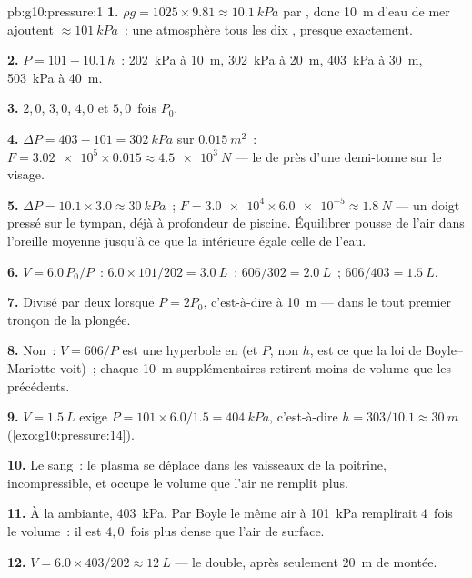 \begin{solution}{pb:g10:pressure:1}
\textbf{1.} $\rho g = 1025 \times 9.81 \approx \qty{10.1}{kPa}$ par
, donc \qty{10}{m} d'eau de mer ajoutent
$\approx \qty{101}{kPa}$~: une atmosphère tous les dix
, presque exactement.

\textbf{2.} $P = 101 + 10.1\,h$~: \qty{202}{kPa} à \qty{10}{m},
\qty{302}{kPa} à \qty{20}{m}, \qty{403}{kPa} à \qty{30}{m},
\qty{503}{kPa} à \qty{40}{m}.

\textbf{3.} $2{,}0$, $3{,}0$, $4{,}0$ et $5{,}0$~fois $P_0$.

\textbf{4.} $\Delta P = 403 - 101 = \qty{302}{kPa}$ sur
$\qty{0.015}{m^2}$~: $F = \num{3.02e5} \times 0.015 \approx
\qty{4.5e3}{N}$ --- le  de près d'une demi-tonne sur
le visage.

\textbf{5.} $\Delta P = 10.1 \times 3.0 \approx \qty{30}{kPa}$~;
$F = \num{3.0e4} \times \num{6.0e-5} \approx \qty{1.8}{N}$ --- un
doigt pressé sur le tympan, déjà à profondeur de piscine. Équilibrer
pousse de l'air dans l'oreille moyenne jusqu'à ce que la
 intérieure égale celle de l'eau.

\textbf{6.} $V = 6.0 \, P_0/P$~: $6.0 \times 101/202 = \qty{3.0}{L}$~;
$606/302 = \qty{2.0}{L}$~; $606/403 = \qty{1.5}{L}$.

\textbf{7.} Divisé par deux lorsque $P = 2P_0$, c'est-à-dire à
\qty{10}{m} --- dans le tout premier tronçon de la plongée.

\textbf{8.} Non~: $V = 606/P$ est une hyperbole en
 (et $P$, non $h$, est ce que la
loi de Boyle--Mariotte voit)~; chaque
\qty{10}{m} supplémentaires retirent moins de volume que les
précédents.

\textbf{9.} $V = \qty{1.5}{L}$ exige
$P = 101 \times 6.0/1.5 = \qty{404}{kPa}$, c'est-à-dire
$h = 303/10.1 \approx \qty{30}{m}$ (\cref{exo:g10:pressure:14}).

\textbf{10.} Le sang~: le plasma se déplace dans les vaisseaux de la
poitrine, incompressible, et occupe le volume que l'air ne remplit
plus.

\textbf{11.} À la  ambiante, \qty{403}{kPa}. Par Boyle le
même air à \qty{101}{kPa} remplirait $4$~fois le volume~: il est
$4{,}0$~fois plus dense que l'air de surface.

\textbf{12.} $V = 6.0 \times 403/202 \approx \qty{12}{L}$ --- le
double, après seulement \qty{20}{m} de montée.


\end{solution}
